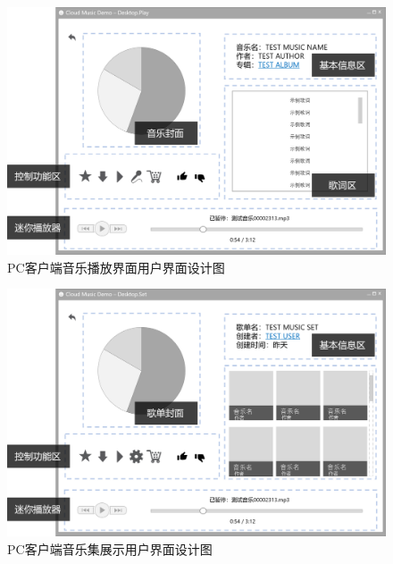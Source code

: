 \begin{figure}[h!]
  \centering
 
  \includegraphics[width=.95\linewidth]{figures/desttop_music}

  \caption{ \label{fig:desttop_music}
  		PC客户端音乐播放界面用户界面设计图
    }
\end{figure}

\newpage
\begin{figure}[h!]
  \centering

  \includegraphics[width=.95\linewidth]{figures/desttop_collection}

  \caption{  \label{fig:desttop_collection}
  		PC客户端音乐集展示用户界面设计图
    }
\end{figure}

